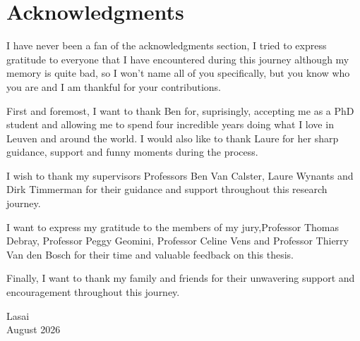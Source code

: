 \chapter*{Acknowledgments}

I have never been a fan of the acknowledgments section, I tried to express gratitude to everyone that I have encountered during this journey although my memory is quite bad, so I won't name all of you specifically, but you know who you are and I am thankful for your contributions. 

First and foremost, I want to thank Ben for, suprisingly, accepting me as a PhD student and allowing me to spend four incredible years doing what I love in Leuven and around the world. I would also like to thank Laure for her sharp guidance, support and funny moments during the process.

I wish to thank my supervisors Professors Ben Van Calster, Laure Wynants and Dirk Timmerman for their guidance and support throughout this research journey. 

I want to express my gratitude to the members of my jury,Professor Thomas Debray, Professor Peggy Geomini, Professor Celine Vens and Professor Thierry Van den Bosch for their time and valuable feedback on this thesis.




Finally, I want to thank my family and friends for their unwavering support and encouragement throughout this journey.





{\raggedleft
Lasai \\
August 2026 \\
}